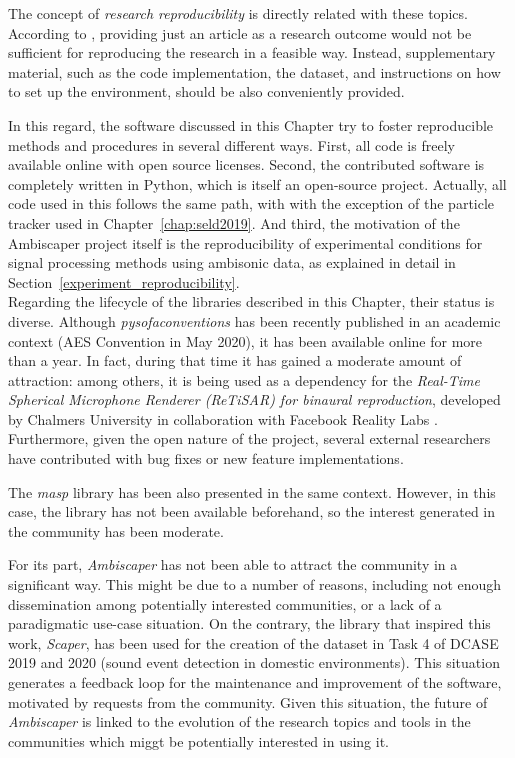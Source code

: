 The concept of \textit{research reproducibility} is directly related with these topics. According to \cite{cannam2012sound}, providing just an article as a research outcome would not be sufficient for reproducing the research in a feasible way. Instead, supplementary material, such as the code implementation, the dataset, and instructions on how to set up the environment, should be also conveniently provided. 

In this regard, the software discussed in this Chapter try to foster reproducible methods and procedures in several different ways.
First, all code is freely available online with open source licenses. 
Second, the contributed software is completely written in Python, which is itself an open-source project. Actually, all code used in this follows the same path, with with the exception of the particle tracker used in Chapter~\ref{chap:seld2019}. 
And third, the motivation of the Ambiscaper project itself is the reproducibility of experimental conditions for signal processing methods using ambisonic data, as explained in detail in Section~\ref{experiment_reproducibility}.\\

Regarding the lifecycle of the libraries described in this Chapter, their status is diverse. Although \textit{pysofaconventions} has been recently published in an academic context (AES Convention in May 2020), it has been available online for more than a year. In fact, during that time it has gained a moderate amount of attraction: among others, it is being used as a dependency for the \textit{Real-Time Spherical Microphone Renderer (ReTiSAR) for binaural reproduction}, developed by Chalmers University in collaboration with Facebook Reality Labs \cite{helmholz2019real}. Furthermore, given the open nature of the project, several external researchers have contributed with bug fixes or new feature implementations.

The \textit{masp} library has been also presented in the same context. However, in this case, the library has not been available beforehand, so the interest generated in the community has been moderate. 

For its part, \textit{Ambiscaper} has not been able to attract the community in a significant way. This might be due to a number of reasons, including not enough dissemination among potentially interested communities, or a lack of a paradigmatic use-case situation. 
On the contrary, the library that inspired this work, \textit{Scaper}, has been used for the creation of the dataset in Task 4 of DCASE 2019 and 2020 (sound event detection in domestic environments). This situation generates a feedback loop for the maintenance and improvement of the software, motivated by requests from the community.
Given this situation, the future of \textit{Ambiscaper} is linked to the evolution of the research topics and tools in the communities which miggt be potentially interested in using it. 






